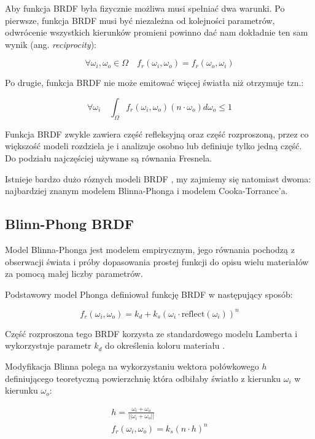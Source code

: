 \documentclass[../main.tex]{subfiles}
\begin{document}
Aby funkcja BRDF była fizycznie możliwa  musi spełniać dwa warunki. Po pierwsze, funkcja BRDF musi być
niezależna od kolejności parametrów, odwrócenie wszystkich kierunków promieni
powinno dać nam dokładnie ten sam wynik (ang. \textit{reciprocity}):

\[
  \forall{\omega_i, \omega_o \in \Omega} \quad
  f_r(\omega_i, \omega_o) = f_r(\omega_o, \omega_i)
\]

Po drugie, funkcja BRDF nie może emitować więcej światła niż otrzymuje tzn.:

\[
  \forall{\omega_i} \quad
  \int_{\Omega} {
    f_r(\omega_i, \omega_o)
    (n \cdot \omega_o)
    d\omega_o
  } \leq 1
\]

Funkcja BRDF zwykle zawiera część refleksyjną oraz część rozproszoną, przez co
większość modeli rozdziela je i analizuje osobno lub definiuje tylko jedną
część. Do podziału najczęściej używane są równania Fresnela.

Istnieje bardzo dużo róznych modeli BRDF \cite{brdf_overview}, my zajmiemy się
natomiast dwoma: najbardziej znanym modelem Blinna-Phonga i modelem
Cooka-Torrance'a.

\subsection{Blinn-Phong BRDF}

Model Blinna-Phonga jest modelem empirycznym, jego równania pochodzą z
obserwacji świata i próby dopasowania prostej funkcji do opisu wielu materiałów
za pomocą małej liczby parametrów.

Podstawowy model Phonga definiował funkcję BRDF w następujący sposób:

\[
f_r(\omega_i, \omega_o) =
  k_d + k_s \left(
    \omega_i \cdot
    \text{reflect}\left(\omega_i\right)
  \right)^{n}
\]

Część rozproszona tego BRDF korzysta ze standardowego modelu Lamberta i
wykorzystuje parametr $k_d$ do określenia koloru materiału .

Modyfikacja Blinna polega na wykorzystaniu wektora połówkowego $h$
definiującego teoretyczną powierzchnię która odbiłaby światło z kierunku
$\omega_i$ w kierunku $\omega_o$:

\begin{gather*}
  h = \frac{\omega_i + \omega_o}{||\omega_i+\omega_o||} \\
  f_r(\omega_i, \omega_o) = k_s (n \cdot h)^{n}
\end{gather*}
\end{document}
